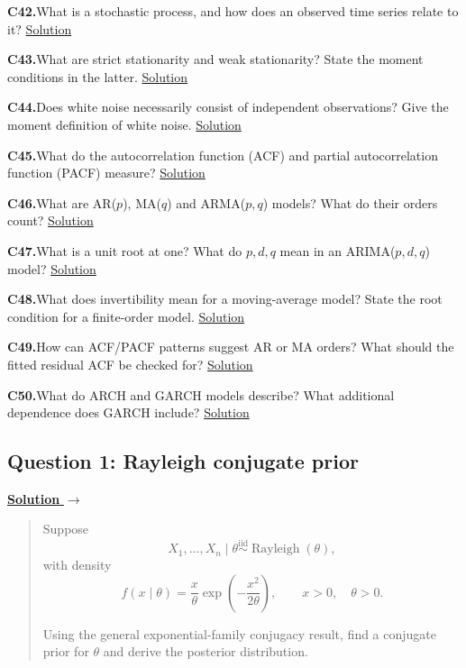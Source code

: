 \documentclass[11pt,a4paper]{article}
\newcommand{\given}{\mathrel{|}}
\newenvironment{examquestion}[2]
  {\subsection{#1}\label{question:\arabic{subsection}}\label{#2}%
   \noindent\hyperref[answer:\arabic{subsection}]{\textbf{Solution} $\rightarrow$}%
   \begin{quote}\color{statgrey}}
  {\end{quote}}
\newcommand{\concepttopic}[1]{%
  \par\addvspace{8pt}\noindent{\color{statblue}\bfseries #1}\par\nobreak\smallskip}
\newcommand{\conceptquestion}[3]{%
  \par\addvspace{4pt}\noindent%
  \hypertarget{concept-question:#1}{}%
  \label{#3}%
  \textbf{C#1.}\enspace #2%
  \unskip\nobreak\hspace{0.4em}\mbox{\hyperlink{concept-answer:#1}{\textcolor{statblue}{Solution}}}\par}
\begin{document}
\begin{multicols}{2}
\concepttopic{Time series}
\conceptquestion{42}{What is a stochastic process, and how does an observed time series relate to it?}{question:concept-process-and-realisation}
\conceptquestion{43}{What are strict stationarity and weak stationarity? State the moment conditions in the latter.}{question:concept-two-stationarity-definitions}
\conceptquestion{44}{Does white noise necessarily consist of independent observations? Give the moment definition of white noise.}{question:concept-white-noise-is-not-necessarily-independent}
\conceptquestion{45}{What do the autocorrelation function (ACF) and partial autocorrelation function (PACF) measure?}{question:concept-acf-and-pacf}
\conceptquestion{46}{What are AR($p$), MA($q$) and ARMA($p,q$) models? What do their orders count?}{question:concept-ar-ma-and-arma-orders}
\conceptquestion{47}{What is a unit root at one? What do $p,d,q$ mean in an ARIMA($p,d,q$) model?}{question:concept-unit-roots-and-arima}
\conceptquestion{48}{What does invertibility mean for a moving-average model? State the root condition for a finite-order model.}{question:concept-invertibility}
\conceptquestion{49}{How can ACF/PACF patterns suggest AR or MA orders? What should the fitted residual ACF be checked for?}{question:concept-identification-and-residual-checks}
\conceptquestion{50}{What do ARCH and GARCH models describe? What additional dependence does GARCH include?}{question:concept-arch-and-garch}
\end{multicols}
\endgroup
\restoregeometry
\setlength{\headwidth}{\textwidth}

\begin{examquestion}{Question 1: Rayleigh conjugate prior}{question:practice-rayleigh-conjugate-prior}
Suppose
\[
  X_1,\ldots,X_n\given\theta
  \overset{\mathrm{iid}}{\sim}\operatorname{Rayleigh}(\theta),
\]
with density
\[
  f(x\given\theta)
  =\frac{x}{\theta}\exp\left(-\frac{x^2}{2\theta}\right),
  \qquad x>0,\quad \theta>0.
\]

Using the general exponential-family conjugacy result, find a conjugate prior
for $\theta$ and derive the posterior distribution.
\end{examquestion}
\end{document}

